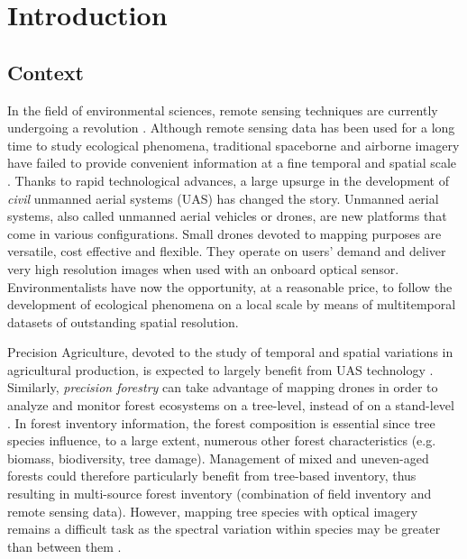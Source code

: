 \documentclass[remotesensing,article,submit,moreauthors,pdftex,12pt,a4paper]{mdpi} %
\begin{document}
\section{Introduction}

\subsection{Context}

In the field of environmental sciences, remote sensing techniques are currently undergoing a revolution \cite{anderson_lightweight_2013}. 
Although remote sensing data has been used for a long time to study ecological phenomena, traditional spaceborne and airborne imagery have failed to provide convenient information at a fine temporal and spatial scale \cite{anderson_lightweight_2013}. 
Thanks to rapid technological advances, a large upsurge in the development of \textit{civil} unmanned aerial systems (UAS) has changed the story. 
Unmanned aerial systems, also called unmanned aerial vehicles or drones, are new platforms that come in various configurations. 
Small drones devoted to mapping purposes are versatile, cost effective and flexible. 
They operate on users' demand and deliver very high resolution images when used with an onboard optical sensor. 
Environmentalists have now the opportunity, at a reasonable price, to follow the development of ecological phenomena on a local scale by means of multitemporal datasets of outstanding spatial resolution.

Precision Agriculture, devoted to the study of temporal and spatial variations in agricultural production, is expected to largely benefit from UAS technology \cite{hunt_acquisition_2010}. 
Similarly, \textit{ precision forestry} can take advantage of mapping drones in order to analyze and monitor forest ecosystems on a tree-level, instead of on a stand-level \cite{drauschke_towards_2014}. 
In forest inventory information, the forest composition is essential since tree species influence, to a large extent, numerous other forest characteristics (e.g. biomass, biodiversity, tree damage). 
Management of mixed and uneven-aged forests could therefore particularly benefit from tree-based inventory, thus resulting in multi-source forest inventory (combination of field inventory and remote sensing data).
However, mapping tree species with optical imagery remains a difficult task as the spectral variation within species may be greater than between them \cite{key_comparison_2001,hill_mapping_2010, burkholder_seasonal_2011}.
\end{document}

